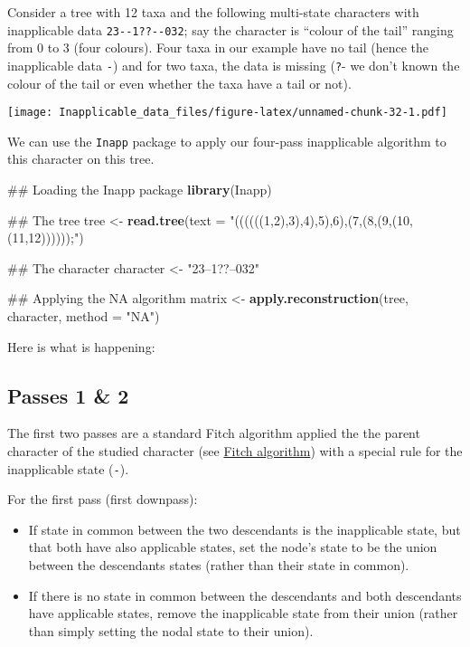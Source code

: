 \documentclass[]{book}
\newenvironment{Shaded}{\begin{snugshade}}{\end{snugshade}}
\newcommand{\KeywordTok}[1]{\textcolor[rgb]{0.13,0.29,0.53}{\textbf{#1}}}
\newcommand{\DataTypeTok}[1]{\textcolor[rgb]{0.13,0.29,0.53}{#1}}
\newcommand{\StringTok}[1]{\textcolor[rgb]{0.31,0.60,0.02}{#1}}
\newcommand{\NormalTok}[1]{#1}
\providecommand{\tightlist}{%
  \setlength{\itemsep}{0pt}\setlength{\parskip}{0pt}}
\theoremstyle{definition}
\theoremstyle{definition}
\theoremstyle{definition}
\theoremstyle{remark}
\begin{document}
Consider a tree with 12 taxa and the following multi-state characters
with inapplicable data \texttt{23-\/-1??-\/-032}; say the character is
``colour of the tail'' ranging from 0 to 3 (four colours). Four taxa in
our example have no tail (hence the inapplicable data \texttt{-}) and
for two taxa, the data is missing (\texttt{?}- we don't known the colour
of the tail or even whether the taxa have a tail or not).

\texttt{[image: Inapplicable\_data\_files/figure-latex/unnamed-chunk-32-1.pdf]}

We can use the \texttt{Inapp} package to apply our four-pass
inapplicable algorithm to this character on this tree.

\begin{Shaded}
\begin{Highlighting}[]
\NormalTok{## Loading the Inapp package}
\KeywordTok{library}\NormalTok{(Inapp)}

\NormalTok{## The tree}
\NormalTok{tree <-}\StringTok{ }\KeywordTok{read.tree}\NormalTok{(}\DataTypeTok{text =} \StringTok{"((((((1,2),3),4),5),6),(7,(8,(9,(10,(11,12))))));"}\NormalTok{)}

\NormalTok{## The character}
\NormalTok{character <-}\StringTok{ "23--1??--032"}

\NormalTok{## Applying the NA algorithm}
\NormalTok{matrix <-}\StringTok{ }\KeywordTok{apply.reconstruction}\NormalTok{(tree, character, }\DataTypeTok{method =} \StringTok{"NA"}\NormalTok{)}
\end{Highlighting}
\end{Shaded}

Here is what is happening:

\hypertarget{passes-1-2}{%
\subsection{Passes 1 \& 2}\label{passes-1-2}}

The first two passes are a standard Fitch algorithm applied the the
parent character of the studied character (see
\protect\hyperlink{fitch}{Fitch algorithm}) with a special rule for the
inapplicable state (\texttt{-}).

For the first pass (first downpass):

\begin{itemize}
\tightlist
\item
  If state in common between the two descendants is the inapplicable
  state, but that both have also applicable states, set the node's state
  to be the union between the descendants states (rather than their
  state in common).
\item
  If there is no state in common between the descendants and both
  descendants have applicable states, remove the inapplicable state from
  their union (rather than simply setting the nodal state to their
  union).
\end{itemize}
\end{document}
